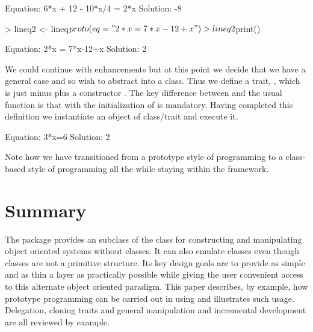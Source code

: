 \documentclass{Z}
\begin{document}
\begin{Schunk}
\begin{Soutput}
Equation: 6*x + 12 - 10*x/4 = 2*x Solution: -8 
\end{Soutput}
\begin{Sinput}
> lineq2 <- lineq$proto(eq = "2*x = 7*x-12+x")
> lineq2$print()
\end{Sinput}
\begin{Soutput}
Equation: 2*x = 7*x-12+x Solution: 2 
\end{Soutput}
\end{Schunk}

We could continue with enhancements but at this point we decide that we
have a general case and so wish
to abstract  into a class.  Thus we define a trait,
, which is just  minus  plus
a constructor .  The key difference between 
and the usual  function
is that with  the initialization of  is mandatory.
Having completed this definition
we instantiate an object of
class/trait  and execute it.

\begin{Schunk}
\begin{Soutput}
Equation: 3*x=6 Solution: 2 
\end{Soutput}
\end{Schunk}

Note how we have transitioned from a prototype style of programming
to a class-based style of programming all the while staying within
the  framework.

\section{Summary} \label{sec:summary}

The package  provides an  subclass of the
 class for constructing and manipulating object
oriented systems without classes.  It can also emulate classes even
though classes are not a primitive structure.  Its key design goals
are to provide as simple and as thin a layer as practically possible
while giving the user convenient access to this alternate object
oriented paradigm.  This paper describes, by example, how prototype
programming can be carried out in  using  and
illustrates such usage.  Delegation, cloning traits and general
manipulation and incremental development are all reviewed by example.
\end{document}
